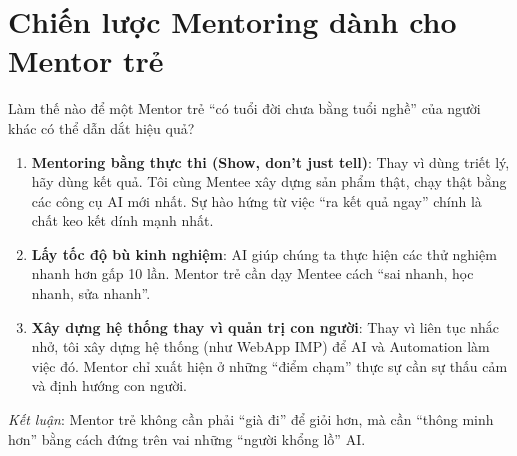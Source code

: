 \section{Chiến lược Mentoring dành cho Mentor trẻ}

Làm thế nào để một Mentor trẻ ``có tuổi đời chưa bằng tuổi nghề'' của người khác có thể dẫn dắt hiệu quả?

\begin{enumerate}
    \item \textbf{Mentoring bằng thực thi (Show, don't just tell)}: Thay vì dùng triết lý, hãy dùng kết quả. Tôi cùng Mentee xây dựng sản phẩm thật, chạy thật bằng các công cụ AI mới nhất. Sự hào hứng từ việc ``ra kết quả ngay'' chính là chất keo kết dính mạnh nhất.
    \item \textbf{Lấy tốc độ bù kinh nghiệm}: AI giúp chúng ta thực hiện các thử nghiệm nhanh hơn gấp 10 lần. Mentor trẻ cần dạy Mentee cách ``sai nhanh, học nhanh, sửa nhanh''.
    \item \textbf{Xây dựng hệ thống thay vì quản trị con người}: Thay vì liên tục nhắc nhở, tôi xây dựng hệ thống (như WebApp IMP) để AI và Automation làm việc đó. Mentor chỉ xuất hiện ở những ``điểm chạm'' thực sự cần sự thấu cảm và định hướng con người.
\end{enumerate}

\textit{Kết luận}: Mentor trẻ không cần phải ``già đi'' để giỏi hơn, mà cần ``thông minh hơn'' bằng cách đứng trên vai những ``người khổng lồ'' AI.

